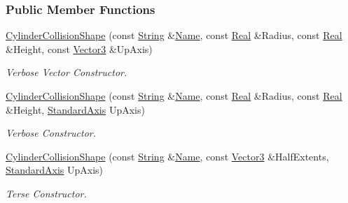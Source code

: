 \subsubsection*{Public Member Functions}
\begin{DoxyCompactItemize}
\item 
\hyperlink{classMezzanine_1_1CylinderCollisionShape_a78818b9e27ed8f144469e268c53dab52}{CylinderCollisionShape} (const \hyperlink{namespaceMezzanine_acf9fcc130e6ebf08e3d8491aebcf1c86}{String} \&\hyperlink{classMezzanine_1_1CollisionShape_aac524c5c56fa4d158bc071f8aecfbe79}{Name}, const \hyperlink{namespaceMezzanine_a726731b1a7df72bf3583e4a97282c6f6}{Real} \&Radius, const \hyperlink{namespaceMezzanine_a726731b1a7df72bf3583e4a97282c6f6}{Real} \&Height, const \hyperlink{classMezzanine_1_1Vector3}{Vector3} \&UpAxis)
\begin{DoxyCompactList}\small\item\em Verbose Vector Constructor. \item\end{DoxyCompactList}\item 
\hyperlink{classMezzanine_1_1CylinderCollisionShape_ad01053f772e3e121aa1e43252f43d3f6}{CylinderCollisionShape} (const \hyperlink{namespaceMezzanine_acf9fcc130e6ebf08e3d8491aebcf1c86}{String} \&\hyperlink{classMezzanine_1_1CollisionShape_aac524c5c56fa4d158bc071f8aecfbe79}{Name}, const \hyperlink{namespaceMezzanine_a726731b1a7df72bf3583e4a97282c6f6}{Real} \&Radius, const \hyperlink{namespaceMezzanine_a726731b1a7df72bf3583e4a97282c6f6}{Real} \&Height, \hyperlink{namespaceMezzanine_ab41a00a8c6a47b576dc987ec34e16ba1}{StandardAxis} UpAxis)
\begin{DoxyCompactList}\small\item\em Verbose Constructor. \item\end{DoxyCompactList}\item 
\hyperlink{classMezzanine_1_1CylinderCollisionShape_ab0bcf2460a915f1a0276ee451a563e56}{CylinderCollisionShape} (const \hyperlink{namespaceMezzanine_acf9fcc130e6ebf08e3d8491aebcf1c86}{String} \&\hyperlink{classMezzanine_1_1CollisionShape_aac524c5c56fa4d158bc071f8aecfbe79}{Name}, const \hyperlink{classMezzanine_1_1Vector3}{Vector3} \&HalfExtents, \hyperlink{namespaceMezzanine_ab41a00a8c6a47b576dc987ec34e16ba1}{StandardAxis} UpAxis)
\begin{DoxyCompactList}\small\item\em Terse Constructor. \item\end{DoxyCompactList}\item 

\end{DoxyCompactItemize}
